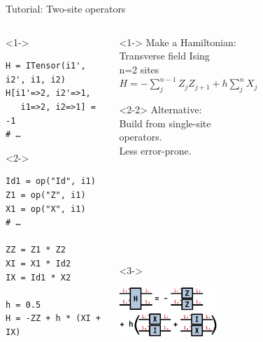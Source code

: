 \begin{frame}[fragile]{Tutorial: Two-site operators}

\begin{columns}

\begin{column}{4.5cm}

\begin{onlyenv}<1->
\begin{lstlisting}[language=JuliaLocal, style=julia, basicstyle=\small]
H = ITensor(i1', i2', i1, i2)
H[i1'=>2, i2'=>1,
   i1=>2, i2=>1] = -1
# …
\end{lstlisting}
\end{onlyenv}

\begin{onlyenv}<2->
\begin{lstlisting}[language=JuliaLocal, style=julia, basicstyle=\small]
Id1 = op("Id", i1)
Z1 = op("Z", i1)
X1 = op("X", i1)
# …

ZZ = Z1 * Z2
XI = X1 * Id2
IX = Id1 * X2

h = 0.5
H = -ZZ + h * (XI + IX)
\end{lstlisting}
\end{onlyenv}

\end{column}

\begin{column}{5.5cm}

\begin{onlyenv}<1->
Make a Hamiltonian: \\
Transverse field Ising \\
n=2 sites \\
$H = -\sum_j^{n-1} Z_j Z_{j+1} + h \sum_j^n X_j$
\end{onlyenv}

\begin{onlyenv}<2-2>
Alternative: \\
Build from single-site \\
operators. \\
Less error-prone. \\
~\\
~\\
~\\
~\\
~\\
~\\
~\\
\end{onlyenv}

\begin{onlyenv}<3->
\vspace*{0.0cm}
\begin{center}
\includegraphics[width=0.2\textwidth]{
  slides/assets/ising12.png
}
\end{center}
\vspace*{0.0cm}
\end{onlyenv}


\end{column}
\end{columns}
\end{frame}
